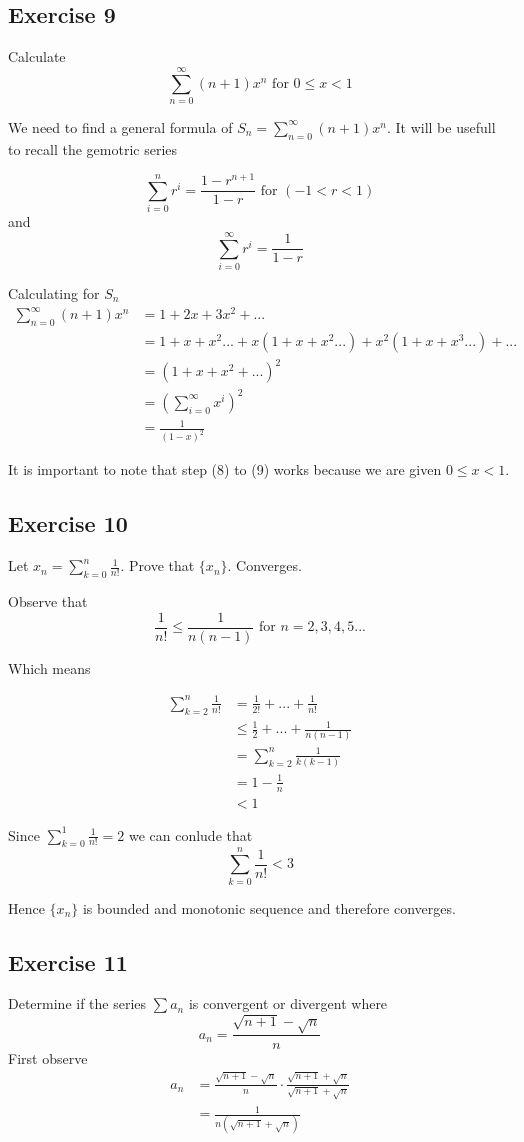 \documentclass{tufte-book}
\theoremstyle{mytheoremstyle}
\theoremstyle{mylemstyle}
\theoremstyle{mydefstyle}
\begin{document}
\subsection{Exercise 9}
Calculate
\[ \sum_{n=0}^{\infty}(n+1)x^n \text{ for } 0 \leq x < 1 \]

We need to find a general formula of $S_n = \sum_{n=0}^{\infty}(n+1)x^n$.  It will be usefull to recall the gemotric series

\[ \sum_{i=0}^{n} r^i = \frac{1-r^{n+1}}{1-r} \text{ for } (-1 < r < 1) \]
and
\[ \sum_{i=0}^{\infty} r^i = \frac{1}{1-r} \]

Calculating for $S_n$
\begin{align}
\sum_{n=0}^{\infty}(n+1)x^n &= 1 + 2x + 3x^2 + ...\\
&= 1 + x + x^2 ... + x(1 + x + x^2...) + x^2(1 + x + x^3...) +...\\
&= (1 + x + x^2 + ...)^2 \\
&= (\sum_{i=0}^{\infty} x^i)^2\\
&= \frac{1}{(1-x)^2}
\end{align}

It is important to note that step (8) to (9) works because we are given $0 \leq x < 1$.


\subsection{Exercise 10}

Let $x_n = \sum_{k=0}^n \frac{1}{n!}$.  Prove that $\{x_n\}$.  Converges.

Observe that
\[ \frac{1}{n!} \leq \frac{1}{n(n-1)} \text{ for } n = 2, 3,4,5... \]

Which means

\begin{align*}
\sum_{k=2}^n \frac{1}{n!} &= \frac{1}{2!} + ... + \frac{1}{n!}\\
&\leq \frac{1}{2} + ... + \frac{1}{n(n-1)} \\
&= \sum_{k=2}^n \frac{1}{k(k-1)} \\
&= 1 - \frac{1}{n}\\
&< 1
\end{align*}

Since $\sum_{k=0}^1 \frac{1}{n!} = 2$ we can conlude that
\[ \sum_{k=0}^n \frac{1}{n!} < 3 \]

Hence $\{x_n\}$ is bounded and monotonic sequence and therefore converges.

\subsection{Exercise 11}
Determine if the series $\sum a_n$ is convergent or divergent where
\[ a_n = \frac{\sqrt{n+1} - \sqrt{n}}{n} \]
First observe
\begin{align*}
a_n &= \frac{\sqrt{n+1} - \sqrt{n}}{n} \cdot \frac{\sqrt{n+1} + \sqrt{n}}{\sqrt{n+1} + \sqrt{n}}\\
&= \frac{1}{n(\sqrt{n+1} + \sqrt{n})}\\
\end{align*}
\end{document}
